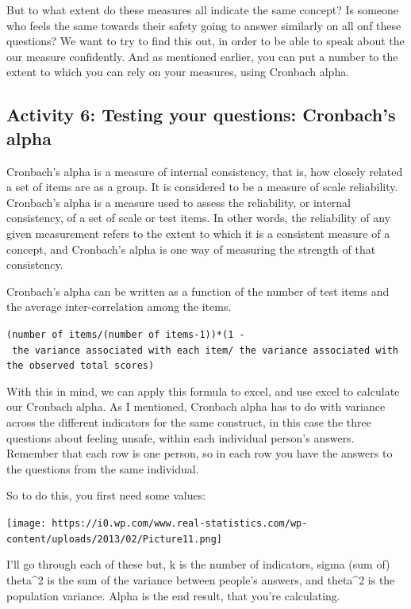 \documentclass[]{book}
\theoremstyle{definition}
\theoremstyle{definition}
\theoremstyle{definition}
\theoremstyle{remark}
\begin{document}
But to what extent do these measures all indicate the same concept? Is
someone who feels the same towards their safety going to answer
similarly on all onf these questions? We want to try to find this out,
in order to be able to speak about the our measure confidently. And as
mentioned earlier, you can put a number to the extent to which you can
rely on your measures, using Cronbach alpha.

\hypertarget{activity-6-testing-your-questions-cronbachs-alpha}{%
\subsection{Activity 6: Testing your questions: Cronbach's
alpha}\label{activity-6-testing-your-questions-cronbachs-alpha}}

Cronbach's alpha is a measure of internal consistency, that is, how
closely related a set of items are as a group. It is considered to be a
measure of scale reliability. Cronbach's alpha is a measure used to
assess the reliability, or internal consistency, of a set of scale or
test items. In other words, the reliability of any given measurement
refers to the extent to which it is a consistent measure of a concept,
and Cronbach's alpha is one way of measuring the strength of that
consistency.

Cronbach's alpha can be written as a function of the number of test
items and the average inter-correlation among the items.

\texttt{(number\ of\ items/(number\ of\ items-1))*(1\ -\ the\ variance\ associated\ with\ each\ item/\ the\ variance\ associated\ with\ the\ observed\ total\ scores)}

 With this in mind, we can apply this formula to excel, and use excel to
calculate our Cronbach alpha. As I mentioned, Cronbach alpha has to do
with variance across the different indicators for the same construct, in
this case the three questions about feeling unsafe, within each
individual person's answers. Remember that each row is one person, so in
each row you have the answers to the questions from the same individual.

So to do this, you first need some values:

\texttt{[image: https://i0.wp.com/www.real-statistics.com/wp-content/uploads/2013/02/Picture11.png]}

I'll go through each of these but, k is the number of indicators, sigma
(sum of) theta\^{}2 is the sum of the variance between people's answers,
and theta\^{}2 is the population variance. Alpha is the end result, that
you're calculating.
\end{document}

